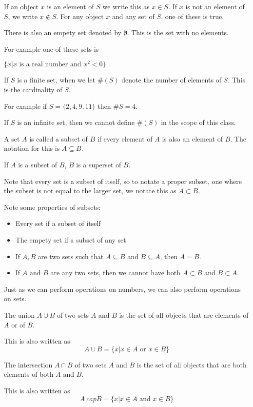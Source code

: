 \documentclass[10pt,a4paper,oneside]{book}
\begin{document}
If an object $x$ is an element of $S$ we write this as $x\in S$. If $x$ is not an element of $S$, we write $x\notin S$. For any object $x$ and any set of $S$, one of these is true.

There is also an empety set denoted by $\emptyset$. This is the set with no elements.

For example one of these sets is 
\begin{center}
    $\{x|x \text{ is a real number and } x^2<0\}$
\end{center}

If $S$ is a finite set, when we let $\#(S)$ denote the number of elements of $S$. This is the cardinality of $S$.

For example if $S=\{2,4,9,11\}$ then $\#S = 4$.

If $S$ is an infinite set, then we cannot define $\#(S)$ in the scope of this class.

A set $A$ is called a subset of $B$ if every element of $A$ is also an element of $B$. The notation for this is $A\subseteq B$.

If $A$ is a subset of $B$, $B$ is a superset of $B$.

Note that every set is a subset of itself, so to notate a proper subset, one where the subset is not equal to the larger set, we notate this as $A\subset B$.

Note some properties of subsets:
\begin{itemize}
    \item Every set if a subset of itself 
    \item The empety set if a subset of any set 
    \item If $A,B$ are two sets such that $A\subseteq B$ and $B\subseteq A$, then $A=B$.
    \item If $A$ and $B$ are any two sets, then we cannot have both $A\subset B$ and $B\subset A$.
\end{itemize}

Just as we can perform operations on numbers, we can also perform operations on sets.

\begin{definition}
    The union $A\cup B$ of two sets $A$ and $B$ is the set of all objects that are elements of $A$ or of $B$.

    This is also written as 
    \[ A \cup B = \{ x|x \in A \text { or } x\in B\}\]
\end{definition}

\begin{definition}
    The intersection $A\cap B$ of two sets $A$ and $B$ is the set of all objects that are both elements of both $A$ and $B$.

    This is also written as 
    \[ A \ cap B = \{ x|x \in A \text{ and } x \in B \}\]
\end{definition}
\end{document}
